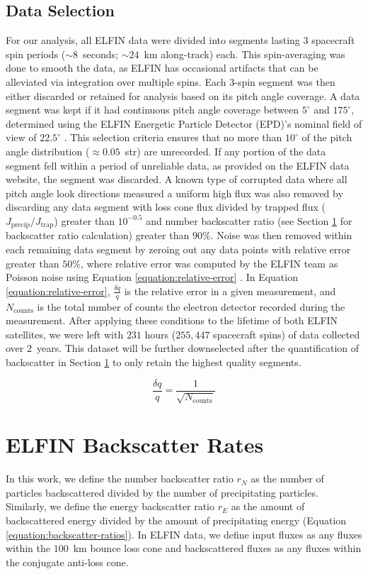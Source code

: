 \documentclass[draft]{agujournal2019}
\newcommand{\mathdeg}{^\circ}
\newcommand{\dataselectiontime}{$231$ hours ($255,447$ spacecraft spins) }
\begin{document}
\subsection{Data Selection} \label{sec:data-selection}
For our analysis, all ELFIN data were divided into segments lasting 3 spacecraft spin periods ($\sim 8$~seconds; $\sim 24$~km along-track) each. This spin-averaging was done to smooth the data, as ELFIN has occasional artifacts that can be alleviated via integration over multiple spins. Each 3-spin segment was then either discarded or retained for analysis based on its pitch angle coverage. A data segment was kept if it had continuous pitch angle coverage between $5\mathdeg$ and $175\mathdeg$, determined using the ELFIN Energetic Particle Detector (EPD)'s nominal field of view of $22.5\mathdeg$ \cite{angelopoulos2020}. This selection criteria ensures that no more than $10\mathdeg$ of the pitch angle distribution ($\approx 0.05$~str) are unrecorded. If any portion of the data segment fell within a period of unreliable data, as provided on the ELFIN data website, the segment was discarded. A known type of corrupted data where all pitch angle look directions measured a uniform high flux was also removed by discarding any data segment with loss cone flux divided by trapped flux ($J_\text{precip}/J_\text{trap}$) greater than $10^{-0.5}$ and number backscatter ratio (see Section \ref{section:data-backscatter} for backscatter ratio calculation) greater than $90\%$. Noise was then removed within each remaining data segment by zeroing out any data points with relative error greater than $50\%$, where relative error was computed by the ELFIN team as Poisson noise using Equation \ref{equation:relative-error} \cite{tsai-email}. In Equation \ref{equation:relative-error}, $\frac{\delta q}{q}$ is the relative error in a given measurement, and $N_\text{counts}$ is the total number of counts the electron detector recorded during the measurement. After applying these conditions to the lifetime of both ELFIN satellites, we were left with \dataselectiontime of data collected over $2$~years. This dataset will be further downselected after the quantification of backscatter in Section \ref{section:data-backscatter} to only retain the highest quality segments.

\begin{equation}
  \label{equation:relative-error}
  \frac{\delta q}{q} = \frac{1}{\sqrt{N_\text{counts}}}
\end{equation}


\section{ELFIN Backscatter Rates} \label{section:data-backscatter}
In this work, we define the number backscatter ratio $r_N$ as the number of particles backscattered divided by the number of precipitating particles. Similarly, we define the energy backscatter ratio $r_E$ as the amount of backscattered energy divided by the amount of precipitating energy (Equation \ref{equation:backscatter-ratios}). In ELFIN data, we define input fluxes as any fluxes within the $100$~km bounce loss cone and backscattered fluxes as any fluxes within the conjugate anti-loss cone.
\end{document}
